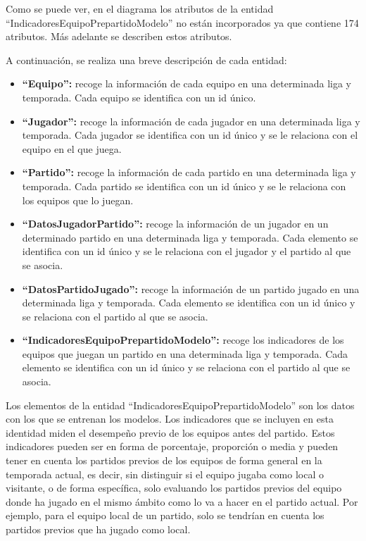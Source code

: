 Como se puede ver, en el diagrama los atributos de la entidad ``IndicadoresEquipoPrepartidoModelo'' no están incorporados ya que contiene 174 atributos. Más adelante se describen estos atributos.

A continuación, se realiza una breve descripción de cada entidad:
\begin{itemize}
    \item \textbf{``Equipo'':} recoge la información de cada equipo en una determinada liga y temporada. Cada equipo se identifica con un id único.
    \item \textbf{``Jugador'':} recoge la información de cada jugador en una determinada liga y temporada.
          Cada jugador se identifica con un id único y se le relaciona con el equipo en el que juega.
    \item \textbf{``Partido'':} recoge la información de cada partido en una determinada liga y temporada. Cada
          partido se identifica con un id único y se le relaciona con los equipos que lo juegan.
    \item \textbf{``DatosJugadorPartido'':} recoge la información de un jugador en un determinado partido en
          una determinada liga y temporada. Cada elemento se identifica con un id único y se le
          relaciona con el jugador y el partido al que se asocia.
    \item \textbf{``DatosPartidoJugado'':} recoge la información de un partido jugado en una determinada liga
          y temporada. Cada elemento se identifica con un id único y se relaciona con el partido al
          que se asocia.
    \item \textbf{``IndicadoresEquipoPrepartidoModelo'':} recoge los indicadores de los equipos que juegan
          un partido en una determinada liga y temporada. Cada elemento se identifica con un id
          único y se relaciona con el partido al que se asocia.
\end{itemize}

\hypertarget{explicacion-indicadores}{Los elementos de la entidad ``IndicadoresEquipoPrepartidoModelo'' son los datos con los que se
entrenan los modelos. Los indicadores que se incluyen en esta identidad miden el desempeño
previo de los equipos antes del partido. Estos indicadores pueden ser en forma de porcentaje,
proporción o media y pueden tener en cuenta los partidos previos de los equipos de forma general
en la temporada actual, es decir, sin distinguir si el equipo jugaba como local o visitante, o de
forma específica, solo evaluando los partidos previos del equipo donde ha jugado en el mismo
ámbito como lo va a hacer en el partido actual. Por ejemplo, para el equipo local de un partido,
solo se tendrían en cuenta los partidos previos que ha jugado como local.}

